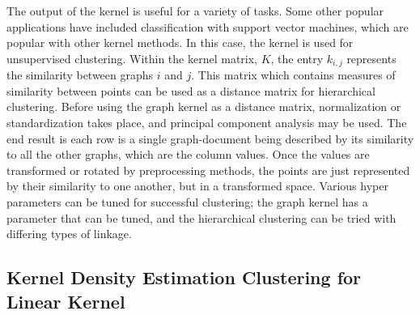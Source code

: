 The output of the kernel is useful for a variety of tasks. Some other popular applications have included classification with support vector machines, which are popular with other kernel methods. In this case, the kernel is used for unsupervised clustering. Within the kernel matrix, $K$, the entry $k_{i,j}$ represents the similarity between graphs $i$ and $j$. This matrix which contains measures of similarity between points can be used as a distance matrix for hierarchical clustering. Before using the graph kernel as a distance matrix, normalization or standardization takes place, and principal component analysis may be used. The end result is each row is a single graph-document being described by its similarity to all the other graphs, which are the column values. Once the values are transformed or rotated by preprocessing methods, the points are just represented by their similarity to one another, but in a transformed space. Various hyper parameters can be tuned for successful clustering; the graph kernel has a parameter that can be tuned, and the hierarchical clustering can be tried with differing types of linkage.


\subsection{Kernel Density Estimation Clustering for Linear Kernel}







